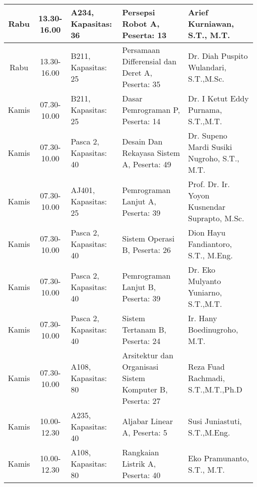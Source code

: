 \begin{longtable}[c]{|c|c|>{\centering\arraybackslash}m{2.5cm}|>{\centering\arraybackslash}m{4cm}|>{\centering\arraybackslash}m{3cm}|}
  Rabu   & 13.30-16.00 & A234, Kapasitas: 36    & Persepsi Robot A, \linebreak Peserta: 13                            & Arief Kurniawan, S.T., M.T.                   \\ \hline
  Rabu   & 13.30-16.00 & B211, Kapasitas: 25    & Persamaan Differensial dan Deret A, \linebreak Peserta: 35          & Dr. Diah Puspito Wulandari, S.T.,M.Sc.        \\ \hline
  Kamis  & 07.30-10.00 & B211, Kapasitas: 25    & Dasar Pemrograman P, \linebreak Peserta: 14                         & Dr. I Ketut Eddy Purnama, S.T.,M.T.           \\ \hline
  Kamis  & 07.30-10.00 & Pasca 2, Kapasitas: 40 & Desain Dan Rekayasa Sistem A, \linebreak Peserta: 49                & Dr. Supeno Mardi Susiki Nugroho, S.T., M.T.   \\ \hline
  Kamis  & 07.30-10.00 & AJ401, Kapasitas: 25   & Pemrograman Lanjut A, \linebreak Peserta: 39                        & Prof. Dr. Ir. Yoyon Kusnendar Suprapto, M.Sc. \\ \hline
  Kamis  & 07.30-10.00 & Pasca 2, Kapasitas: 40 & Sistem Operasi B, \linebreak Peserta: 26                            & Dion Hayu Fandiantoro, S.T., M.Eng.           \\ \hline
  Kamis  & 07.30-10.00 & Pasca 2, Kapasitas: 40 & Pemrograman Lanjut B, \linebreak Peserta: 39                        & Dr. Eko Mulyanto Yuniarno, S.T.,M.T.          \\ \hline
  Kamis  & 07.30-10.00 & Pasca 2, Kapasitas: 40 & Sistem Tertanam B, \linebreak Peserta: 24                           & Ir. Hany Boedinugroho, M.T.                   \\ \hline
  Kamis  & 07.30-10.00 & A108, Kapasitas: 80    & Arsitektur dan Organisasi Sistem Komputer B, \linebreak Peserta: 27 & Reza Fuad Rachmadi, S.T.,M.T.,Ph.D            \\ \hline
  Kamis  & 10.00-12.30 & A235, Kapasitas: 40    & Aljabar Linear A, \linebreak Peserta: 5                             & Susi Juniastuti, S.T.,M.Eng.                  \\ \hline
  Kamis  & 10.00-12.30 & A108, Kapasitas: 80    & Rangkaian Listrik A, \linebreak Peserta: 40                         & Eko Pramunanto, S.T., M.T.                    \\ \hline

\end{longtable}
